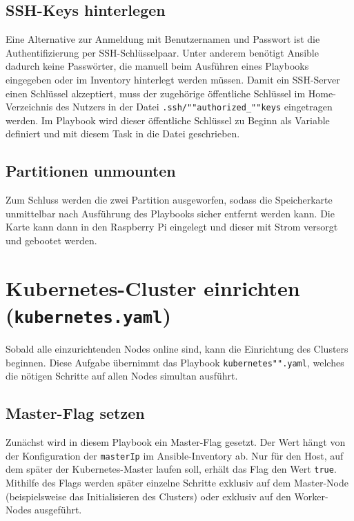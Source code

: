 \subsection{SSH-Keys hinterlegen}\label{subsec:ssh-keys-hinterlegen}

Eine Alternative zur Anmeldung mit Benutzernamen und Passwort ist die Authentifizierung per SSH-Schlüsselpaar.
Unter anderem benötigt Ansible dadurch keine Passwörter, die manuell beim Ausführen eines Playbooks eingegeben oder im Inventory hinterlegt werden müssen.
Damit ein SSH-Server einen Schlüssel akzeptiert, muss der zugehörige öffentliche Schlüssel im Home-Verzeichnis des Nutzers in der Datei \texttt{.ssh/""authorized\_""keys} eingetragen werden.
Im Playbook wird dieser öffentliche Schlüssel zu Beginn als Variable definiert und mit diesem Task in die Datei geschrieben.

\subsection{Partitionen unmounten}\label{subsec:partitionen-unmounten}

Zum Schluss werden die zwei Partition ausgeworfen, sodass die Speicherkarte unmittelbar nach Ausführung des Playbooks sicher entfernt werden kann.
Die Karte kann dann in den Raspberry Pi eingelegt und dieser mit Strom versorgt und gebootet werden.

\section{Kubernetes-Cluster einrichten (\texttt{kubernetes.yaml})}

Sobald alle einzurichtenden Nodes online sind, kann die Einrichtung des Clusters beginnen.
Diese Aufgabe übernimmt das Playbook \texttt{kubernetes"".yaml}, welches die nötigen Schritte auf allen Nodes simultan ausführt.

\subsection{Master-Flag setzen}\label{subsec:master-flag-setzen}

Zunächst wird in diesem Playbook ein Master-Flag gesetzt.
Der Wert hängt von der Konfiguration der \texttt{masterIp} im Ansible-Inventory ab.
Nur für den Host, auf dem später der Kubernetes-Master laufen soll, erhält das Flag den Wert \texttt{true}.
Mithilfe des Flags werden später einzelne Schritte exklusiv auf dem Master-Node (beispielsweise das Initialisieren des Clusters) oder exklusiv auf den Worker-Nodes ausgeführt.

